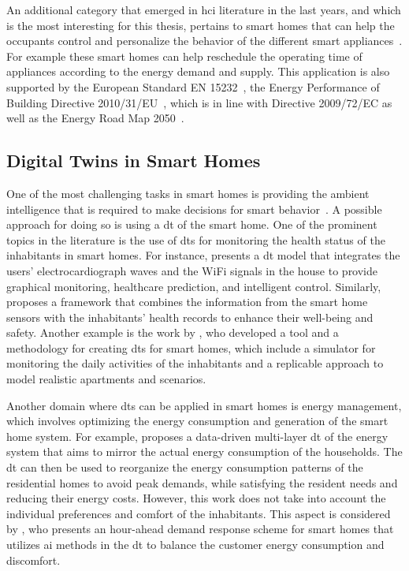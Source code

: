 An additional category that emerged in \acrfull{hci} literature in the last years, and which is the most interesting for this thesis, pertains to smart homes that can help the occupants control and personalize the behavior of the different smart appliances~\parencite{desilvaStateArtSmart2012,lobaccaroReviewSystemsTechnologies2016}. For example these smart homes can help reschedule the operating time of appliances according to the energy demand and supply. This application is also supported by the European Standard EN 15232~\parencite{comiteeuropeendenormalisationEnergyPerformanceBuildings2012}, the Energy Performance of Building Directive 2010/31/EU~\parencite{europeanparliamentDirectiveEU20182018}, which is in line with Directive 2009/72/EC as well as the Energy Road Map 2050~\parencite{europeanclimatefoundationEnergyRoadmap20502011}.

\subsection{Digital Twins in Smart Homes}

One of the most challenging tasks in smart homes is providing the ambient intelligence that
is required to make decisions for smart behavior~\parencite{desilvaStateArtSmart2012}. A possible approach for doing so is using a \acrfull{dt} of the smart home. One of the prominent topics in the literature is the use of \acrshort{dt}s for monitoring the health status of the inhabitants in smart homes. For instance, \textcite{chenDigitalTwinEmpowered2023} presents a \acrshort{dt} model that integrates the users' electrocardiograph waves and the WiFi signals in the house to provide graphical monitoring, healthcare prediction, and intelligent control. Similarly, \textcite{shoukatSmartHomeEnhanced2023} proposes a framework that combines the information from the smart home sensors with the inhabitants' health records to enhance their well-being and safety. Another example is the work by \textcite{bouchabouSmartHomeDigital2023}, who developed a tool and a methodology for creating \acrshort{dt}s for smart homes, which include a simulator for monitoring the daily activities of the inhabitants and a replicable approach to model realistic apartments and scenarios.

Another domain where \acrshort{dt}s can be applied in smart homes is energy management, which involves optimizing the energy consumption and generation of the smart home system. For example, \textcite{fathyDigitalTwinDrivenDecision2021} proposes a data-driven multi-layer \acrshort{dt} of the energy system that aims to mirror the actual energy consumption of the households. The \acrshort{dt} can then be used to reorganize the energy consumption patterns of the residential homes to avoid peak demands, while satisfying the resident needs and reducing their energy costs. However, this work does not take into account the individual preferences and comfort of the inhabitants. This aspect is considered by \textcite{huangMachineLearningbasedDemand2023}, who presents an hour-ahead demand response scheme for smart homes that utilizes \acrshort{ai} methods in the \acrshort{dt} to balance the customer energy consumption and discomfort.

